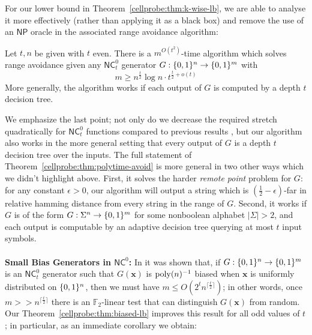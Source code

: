For our lower bound in Theorem~\ref{cellprobe:thm:k-wise-lb}, we are able to analyse it more effectively (rather than applying it as a black box) and remove the use of an $\mathsf{NP}$ oracle in the associated range avoidance algorithm:

\begin{theorem}

Let $t,n$ be given with $t$ even. There is a $m^{O(t^2)}$-time algorithm which solves range avoidance given any $\mathsf{NC}^0_t$ generator $G: \{0,1\}^n \to \{0,1\}^m$ with
\[
m \geq  n^{\frac{t}{2}} \log n \cdot t^{\frac{t}{2} + o(t)}
\]
More generally, the algorithm works if each output of $G$ is computed by a depth $t$ decision tree.
\end{theorem}
We emphasize the last point; not only do we decrease the required stretch quadratically for $\mathsf{NC}^0_t$ functions compared to previous results \cite{guruswami2022range,karthik}, but our algorithm also works in the more general setting that every output of $G$ is a depth $t$ decision tree over the inputs. The full statement of Theorem~\ref{cellprobe:thm:polytime-avoid} is more general in two other ways which we didn't highlight above. First, it solves the harder \emph{remote point} problem for $G$: for any constant $\epsilon>0$, our algorithm will output a string which is $(\frac{1}{2}-\epsilon)$-far in relative hamming distance from every string in the range of $G$. Second, it works if $G$ is of the form $G: \Sigma^n \to \{0,1\}^m$ for some nonboolean alphabet $|\Sigma|>2$, and each output is computable by an adaptive decision tree querying at most $t$ input symbols.
~\\~\\
{\bf \noindent Small Bias Generators in $\mathsf{NC}^0$:} In \cite{mossel-epsilon} it was shown that, if $G: \{0,1\}^n \to \{0,1\}^m$ is an $\mathsf{NC}^0_t$ generator such that $G(\bm{x})$ is $\mathrm{poly}(n)^{-1}$ biased when $\bm{x}$ is uniformly distributed on $\{0,1\}^n$, then we must have $m \leq O(2^tn^{\lceil \frac{t}{2}\rceil })$; in other words, once $m >> n^{\lceil \frac{t}{2} \rceil}$ there is an $\mathbb{F}_2$-linear test that can distinguish $G(\bm{x})$ from random. Our Theorem~\ref{cellprobe:thm:biased-lb} improves this result for all odd values of $t$; in particular, as an immediate corollary we obtain:

